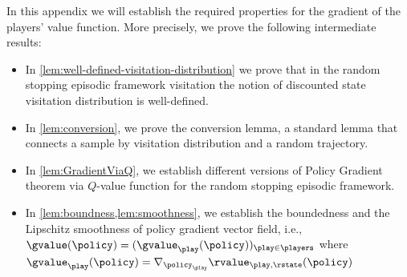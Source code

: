 

In this appendix we will establish the required properties for the gradient of the players' value function.
More precisely, we prove the following intermediate results:
\begin{itemize}[topsep=0pt,leftmargin=2ex]
\item In \cref{lem:well-defined-visitation-distribution} we prove that in the random stopping episodic framework visitation the notion of discounted state visitation distribution is well-defined.
\item In \cref{lem:conversion}, we prove the conversion lemma, a standard lemma that connects a sample by visitation distribution and a random trajectory.
\item In \cref{lem:GradientViaQ}, we establish different versions of Policy Gradient theorem via $Q$-value function for the random stopping episodic framework.
\item In \cref{lem:boundness,lem:smoothness}, we establish the boundedness and the Lipschitz smoothness of policy gradient vector field, i.e., 
$\gvalue(\policy)=(\gvalue_{\play}(\policy))_{\play\in\players} $
where
$\gvalue_{\play}(\policy) = \nabla_{\policy_{\play}} \rvalue_{\play,\rstate}(\policy)$
\end{itemize}

